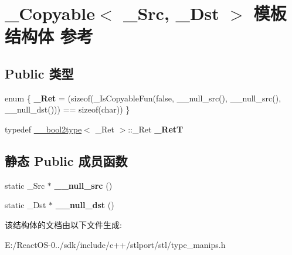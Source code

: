 \hypertarget{struct___copyable}{}\section{\+\_\+\+Copyable$<$ \+\_\+\+Src, \+\_\+\+Dst $>$ 模板结构体 参考}
\label{struct___copyable}
\subsection*{Public 类型}
\begin{DoxyCompactItemize}
\item 
\mbox{\label{struct___copyable_abe8aa00abedfb5922eda664fe84aa032}} 
enum \{ {\bfseries \+\_\+\+Ret} = (sizeof(\+\_\+\+Is\+Copyable\+Fun(false, \+\_\+\+\_\+null\+\_\+src(), \+\_\+\+\_\+null\+\_\+src(), \+\_\+\+\_\+null\+\_\+dst())) == sizeof(char))
 \}
\item 
\mbox{\label{struct___copyable_ae4812799b0091c4f162c6e20613909ba}} 
typedef \hyperlink{struct____bool2type}{\+\_\+\+\_\+bool2type}$<$ \+\_\+\+Ret $>$\+::\+\_\+\+Ret {\bfseries \+\_\+\+RetT}
\end{DoxyCompactItemize}
\subsection*{静态 Public 成员函数}
\begin{DoxyCompactItemize}
\item 
\mbox{\label{struct___copyable_af35d87baad69d3afda788852071cda00}} 
static \+\_\+\+Src $\ast$ {\bfseries \+\_\+\+\_\+null\+\_\+src} ()
\item 
\mbox{\label{struct___copyable_a377c6a618c2c8cbdc087223ff10211f9}} 
static \+\_\+\+Dst $\ast$ {\bfseries \+\_\+\+\_\+null\+\_\+dst} ()
\end{DoxyCompactItemize}


该结构体的文档由以下文件生成\+:\begin{DoxyCompactItemize}
\item 
E\+:/\+React\+O\+S-\/0../sdk/include/c++/stlport/stl/type\+\_\+manips.\+h\end{DoxyCompactItemize}
